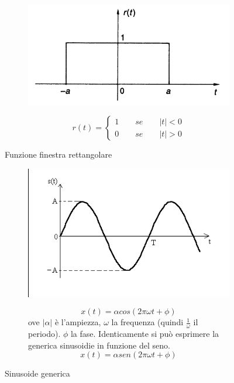 \documentclass[a4paper]{article}
\begin{document}
\begin{figure}[H]
	\begin{subfigure}[c]{0.5\textwidth}
	\includegraphics[width=\textwidth]{rectangular_window.png}
	\end{subfigure}
	\begin{subfigure}[c]{0.5\textwidth}
		\begin{equation*}
			r(t) = 
			\begin{cases}
				1 \qquad se \qquad |t|<0 \\
				0 \qquad se \qquad |t|>0 
			\end{cases}
		\end{equation*}
	\end{subfigure}
	\caption{Funzione finestra rettangolare} \label{FIG:rectangular}
\end{figure}
\begin{figure}[H]
	\begin{subfigure}[c]{0.5\textwidth}
	\includegraphics[width=\textwidth]{generic_sin.png}
	\end{subfigure}
	\begin{subfigure}[c]{0.5\textwidth}
		$$x(t) = \alpha cos(2\pi \omega t + \phi)$$
		ove $|\alpha|$ è l'ampiezza, $\omega$ la frequenza (quindi $\frac{1}{\omega}$ il periodo). $\phi$ la fase.
		Identicamente si può esprimere la generica sinusoidie in funzione del seno.
		$$x(t) = \alpha sen(2\pi \omega t + \phi)$$
	\end{subfigure}
	\caption{Sinusoide generica} \label{FIG:generic_sin}
\end{figure}
\end{document}
